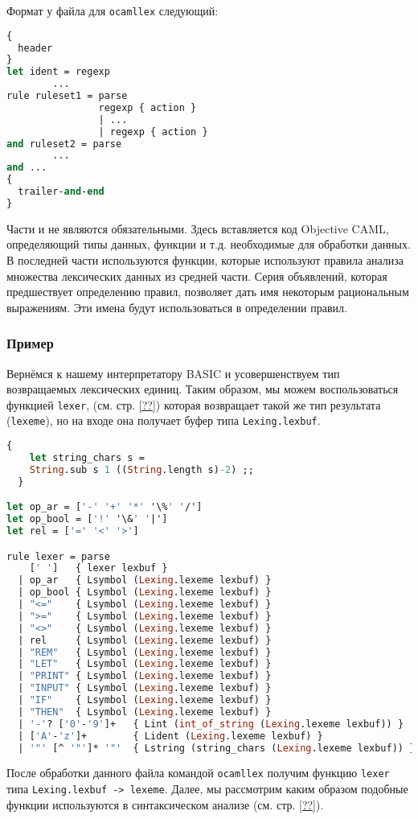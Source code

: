 Формат у файла для \texttt{ocamllex} следующий:

\begin{lstlisting}[language=Caml]
{
  header
}
let ident = regexp
        ...
rule ruleset1 = parse
                regexp { action }
                | ...
                | regexp { action }
and ruleset2 = parse
        ...
and ...
{
  trailer-and-end
}
\end{lstlisting}

Части  и  не являются обязательными.
Здесь вставляется код Objective CAML, определяющий типы данных, функции и т.д.
необходимые для обработки данных. В последней части используются функции,
которые используют правила анализа множества лексических данных из средней
части. Серия объявлений, которая предшествует определению правил, позволяет дать
имя некоторым рациональным выражениям. Эти имена будут использоваться в
определении правил.

\subsubsection{Пример}

Вернёмся к нашему интерпретатору BASIC и усовершенствуем тип возвращаемых
лексических единиц. Таким образом, мы можем воспользоваться функцией
\texttt{lexer}, (см. стр.  \ref{??}) которая возвращает такой же тип результата
(\texttt{lexeme}), но на входе она получает буфер типа \texttt{Lexing.lexbuf}.

\begin{lstlisting}[language=Caml]
  {
    let string_chars s =
    String.sub s 1 ((String.length s)-2) ;;
  }

let op_ar = ['-' '+' '*' '\%' '/']
let op_bool = ['!' '\&' '|']
let rel = ['=' '<' '>']

rule lexer = parse
    [' ']   { lexer lexbuf }
  | op_ar   { Lsymbol (Lexing.lexeme lexbuf) }
  | op_bool { Lsymbol (Lexing.lexeme lexbuf) }
  | "<="    { Lsymbol (Lexing.lexeme lexbuf) }
  | ">="    { Lsymbol (Lexing.lexeme lexbuf) }
  | "<>"    { Lsymbol (Lexing.lexeme lexbuf) }
  | rel     { Lsymbol (Lexing.lexeme lexbuf) }
  | "REM"   { Lsymbol (Lexing.lexeme lexbuf) }
  | "LET"   { Lsymbol (Lexing.lexeme lexbuf) }
  | "PRINT" { Lsymbol (Lexing.lexeme lexbuf) }
  | "INPUT" { Lsymbol (Lexing.lexeme lexbuf) }
  | "IF"    { Lsymbol (Lexing.lexeme lexbuf) }
  | "THEN"  { Lsymbol (Lexing.lexeme lexbuf) }
  | '-'? ['0'-'9']+   { Lint (int_of_string (Lexing.lexeme lexbuf)) }
  | ['A'-'z']+        { Lident (Lexing.lexeme lexbuf) }
  | '"' [^ '"']* '"'  { Lstring (string_chars (Lexing.lexeme lexbuf)) }
\end{lstlisting}

После обработки данного файла командой \texttt{ocamllex} получим функцию
\texttt{lexer} типа \texttt{Lexing.lexbuf -> lexeme}. Далее, мы рассмотрим каким
образом подобные функции используются в синтаксическом анализе (см. стр.
\ref{??}).
